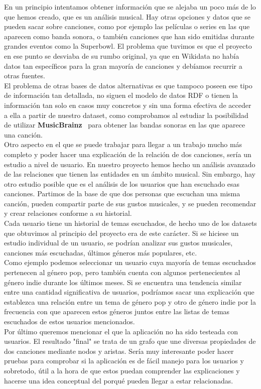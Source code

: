 En un principio intentamos obtener información que se alejaba un poco más de lo que hemos creado, que es un análisis musical. Hay otras opciones y datos que se pueden sacar sobre canciones, como por ejemplo las películas o series en las que aparecen como banda sonora, o también canciones que han sido emitidas durante grandes eventos como la Superbowl. El problema que tuvimos es que el proyecto en ese punto se desviaba de su rumbo original, ya que en Wikidata no había datos tan específicos para la gran mayoría de canciones y debíamos recurrir a otras fuentes.\\

El problema de otras bases de datos alternativas es que tampoco poseen ese tipo de información tan detallada, no siguen el modelo de datos RDF o tienen la información tan solo en casos muy concretos y sin una forma efectiva de acceder a ella a partir de nuestro dataset, como comprobamos al estudiar la posibilidad de utilizar \textbf{MusicBrainz}~\cite{musicbrainz} para obtener las bandas sonoras en las que aparece una canción.\\

Otro aspecto en el que se puede trabajar para llegar a un trabajo mucho más completo y poder hacer una explicación de la relación de dos canciones, sería un estudio a nivel de usuario.
En nuestro proyecto hemos hecho un análisis avanzado de las relaciones que tienen las entidades en un ámbito musical. Sin embargo, hay otro estudio posible que es el análisis de los usuarios que han escuchado esas canciones. Partimos de la base de que dos personas que escuchan una misma canción, pueden compartir parte de sus gustos musicales, y se pueden recomendar y crear relaciones conforme a su historial.\\

Cada usuario tiene un historial de temas escuchados, de hecho uno de los datasets que obtuvimos al principio del proyecto era de este carácter. Si se hiciese un estudio individual de un usuario, se podrían analizar sus gustos musicales, canciones más escuchadas, últimos géneros más populares, etc.\\

Como ejemplo podemos seleccionar un usuario cuya mayoría de temas escuchados pertenecen al género pop, pero también cuenta con algunos pertenecientes al género indie durante los últimos meses. Si se encuentra una tendencia similar entre una cantidad significativa de usuarios, podríamos sacar una explicación que establezca una relación entre un tema de género pop y otro de género indie por la frecuencia con que aparecen estos géneros juntos entre las listas de temas escuchados de estos usuarios mencionados.\\

Por último queremos mencionar el que la aplicación no ha sido testeada con usuarios. El resultado "final" se trata de un grafo que une diversas propiedades de dos canciones mediante nodos y aristas. Sería muy interesante poder hacer pruebas para comprobar si la aplicación es de fácil manejo para los usuarios y sobretodo, útil a la hora de que estos puedan comprender las explicaciones y hacerse una idea conceptual del porqué pueden llegar a estar relacionadas. 


